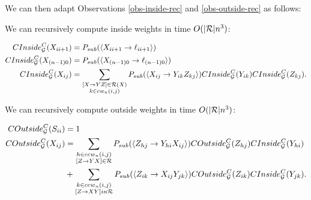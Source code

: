 We can then adapt Observations \ref{obs-inside-rec} and \ref{obs-outside-rec} as follows:

\begin{prop}
We can recursively compute inside weights in time $O(|{\mathcal R}| n^3)$:

\begin{align*}
CInside_{{\mathcal G}}^C(X_{i i+1}) &= P_{sub} (\langle X_{ii+1} \to \ell_{i i+1}\rangle) \\
CInside_{{\mathcal G}}^C(X_{(n-1)0}) &= P_{sub} (\langle X_{(n-1)0} \to \ell_{(n-1)0}\rangle) \\
CInside_{{\mathcal G}}^C(X_{ij}) &= \sum_{\substack{[X\to YZ]\in {\mathcal R}(X)\\ k\in cw_n(i,j)}} 
P_{sub}(\langle X_{ij} \to Y_{ik} Z_{kj}\rangle) CInside_{{\mathcal G}}^C(Y_{ik}) CInside_{{\mathcal G}}^C(Z_{kj}).
\end{align*}
\end{prop}

\begin{prop}
We can recursively compute outside weights in time $O(|{\mathcal R}| n^3)$:

\begin{align*}
COutside_{{\mathcal G}}^C(S_{ii}) &= 1\\
COutside_{{\mathcal G}}^C(X_{ij}) &=
\sum_{\substack{h\in ccw_n(i,j) \\ [Z\to YX] \in {\mathcal R}}} P_{sub}(\langle Z_{hj} \to Y_{hi} X_{ij} \rangle)
COutside_{{\mathcal G}}^C(Z_{hj}) CInside_{{\mathcal G}}^C(Y_{hi})\\
&+ \sum_{\substack{k \in ccw_n(i,j)\\ [Z\to XY] in {\mathcal R}}}
P_{sub}(\langle Z_{ik} \to X_{ij} Y_{jk} \rangle)
COutside_{{\mathcal G}}^C(Z_{ik}) CInside_{{\mathcal G}}^C(Y_{jk}).
\end{align*}
\end{prop}




